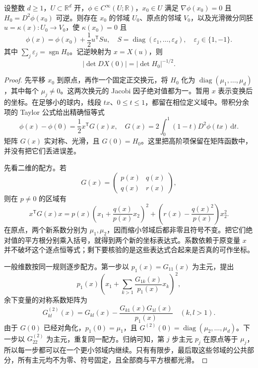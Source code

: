 \begin{lemma}\label{b2:lem:21-morse-normal-form}
设整数 \(d\geq1\)，\(U\subset\mathbb R^d\) 开，\(\phi\in C^\infty(U;\mathbb R)\)，\(x_0\in U\) 满足 \(\nabla\phi(x_0)=0\) 且 \(H_0=D^2\phi(x_0)\) 可逆。则存在 \(x_0\) 的邻域 \(U_0\)、原点的邻域 \(V_0\)，以及光滑微分同胚 \(u=\kappa(x):U_0\longrightarrow V_0\)，使 \(\kappa(x_0)=0\) 且
\[
 \phi(x)=\phi(x_0)+\frac12u^{\mathsf T}Su,
 \quad
 S=\operatorname{diag}(\varepsilon_1,\ldots,\varepsilon_d),
 \quad \varepsilon_j\in\{1,-1\}.
\]
其中 \(\sum_j\varepsilon_j=\operatorname{sgn}H_0\)。记逆映射为 \(x=X(u)\)，则
\[
 |\det DX(0)|=|\det H_0|^{-1/2}.
\]
\end{lemma}
\begin{proof}
先平移 \(x_0\) 到原点，再作一个固定正交换元，将 \(H_0\) 化为
\(\operatorname{diag}(\mu_1,\ldots,\mu_d)\)，其中每个 \(\mu_j\neq0\)。这两次换元的 Jacobi 因子绝对值都为一。暂用 \(x\) 表示变换后的坐标。在足够小的球内，线段 \(tx\)、\(0\leq t\leq1\)，都留在相位定义域中。带积分余项的 Taylor 公式给出精确恒等式
\[
 \phi(x)-\phi(0)=\frac12x^{\mathsf T}G(x)x,
 \quad
 G(x)=2\int_0^1(1-t)D^2\phi(tx)\,\mathrm dt.
\]
矩阵 \(G(x)\) 实对称、光滑，且 \(G(0)=H_0\)。这里把高阶项保留在矩阵函数中，并没有把它们丢进误差。

先看二维的配方。若
\[
 G(x)=
 \begin{pmatrix}p(x)&q(x)\\q(x)&r(x)\end{pmatrix},
\]
则在 \(p\neq0\) 的区域有
\[
 x^{\mathsf T}G(x)x
 =p(x)\left(x_1+\frac{q(x)}{p(x)}x_2\right)^2
  +\left(r(x)-\frac{q(x)^2}{p(x)}\right)x_2^2.
\]
在原点，两个新系数分别为 \(\mu_1,\mu_2\)，因而缩小邻域后都非零且符号不变。把它们绝对值的平方根分别乘入括号，就得到两个新的坐标表达式。系数依赖于原变量 \(x\) 并不破坏这个逐点恒等式；剩下要核验的是这些表达式合起来是否真的可作坐标。

一般维数按同一规则逐步配方。第一步以 \(p_1(x)=G_{11}(x)\) 为主元，提出
\[
 p_1(x)\left(x_1+\sum_{k>1}
                     \frac{G_{1k}(x)}{p_1(x)}x_k\right)^2,
\]
余下变量的对称系数矩阵为
\[
 G^{(2)}_{kl}(x)
 =G_{kl}(x)-\frac{G_{k1}(x)G_{1l}(x)}{p_1(x)}
 \quad(k,l>1).
\]
由于 \(G(0)\) 已经对角化，\(p_1(0)=\mu_1\)，且
\(G^{(2)}(0)=\operatorname{diag}(\mu_2,\ldots,\mu_d)\)。下一步以 \(G^{(2)}_{22}\) 为主元，重复同一配方。归纳可知，第 \(j\) 步主元 \(p_j\) 在原点等于 \(\mu_j\)，所以每一步都可以在一个更小邻域内继续。只有有限步，最后取这些邻域的公共部分，所有主元均不为零、符号固定，且全部商与平方根都光滑。


\end{proof}
